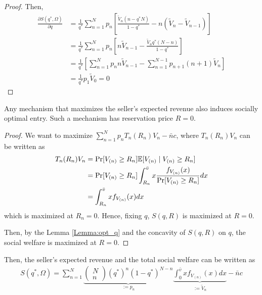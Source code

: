 \documentclass[11pt]{elegantbook_2}
\begin{document}
\begin{proof}
    Then,
    \begin{equation}
        \begin{aligned}
            \frac{\partial S(q^*,\Omega)}{\partial q}&=\frac{1}{q^*}\sum_{n=1}^N p_n \left[\frac{\tilde{V}_n (n-q^*N)}{1-q^*}-n\left(\tilde{V}_n-\tilde{V}_{n-1}\right)\right]\\
            &=\frac{1}{q^*}\sum_{n=1}^N p_n \left[n\tilde{V}_{n-1}-\frac{\tilde{V}_n q^*(N-n)}{1-q^*}\right]\\
            &=\frac{1}{q^*}\left[\sum_{n=1}^N p_nn\tilde{V}_{n-1}-\sum_{n=1}^{N-1} p_{n+1}(n+1)\tilde{V}_n\right]\\
            &=\frac{1}{q^*}p_1\tilde{V}_{0}=0
        \end{aligned}
        \nonumber
    \end{equation}
\end{proof}


\begin{proposition}
    Any mechanism that maximizes the seller's expected revenue also induces socially optimal entry. Such a mechanism has reservation price $R=0$.
\end{proposition}
\begin{proof}
    We want to maximize $\sum_{n=1}^N p_n T_n(R_n)V_n-\bar{n}c$, where $T_n(R_n)V_n$ can be written as
    \begin{equation}
        \begin{aligned}
            T_n(R_n)V_n&=\textnormal{Pr}[V_{(n)}\geq R_n]\mathbb{E}[V_{(n)}\mid V_{(n)}\geq R_n]\\
            &=\textnormal{Pr}[V_{(n)}\geq R_n]
            \int_{R_n}^{\bar{v}}x \frac{f_{V_{(n)}}(x)}{\textnormal{Pr}[V_{(n)}\geq R_n]}dx\\
            &=
            \int_{R_n}^{\bar{v}}x f_{V_{(n)}}(x) dx
        \end{aligned}
        \nonumber
    \end{equation}
    which is maximized at $R_n=0$. Hence, fixing $q$, $S(q,R)$ is maximized at $R=0$.

    Then, by the Lemma \ref{Lemma:opt_q} and the concavity of $S(q,R)$ on $q$, the social welfare is maximized at $R=0$.
\end{proof}
Then, the seller's expected revenue and the total social welfare can be written as
\begin{equation}
    \begin{aligned}
        S(q^*,\Omega)=\sum_{n=1}^N \underbrace{\begin{pmatrix}N\\n\end{pmatrix}(q^*)^{n}(1-q^*)^{N-n}}_{:=p_n} \underbrace{\int_{0}^{\bar{v}}x f_{V_{(n)}}(x) dx}_{:=\tilde{V}_n}-\bar{n}c
    \end{aligned}
    \nonumber
\end{equation}
\end{document}

